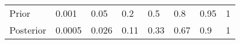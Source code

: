 \begin{table}[ht]
\centering
\begin{tabular}{llllllll}
  \hline
  \hline
Prior & 0.001 & 0.05 & 0.2 & 0.5 & 0.8 & 0.95 &   1 \\ 
  Posterior & 0.0005 & 0.026 & 0.11 & 0.33 & 0.67 & 0.9 &   1 \\ 
   \hline
\end{tabular}
\end{table}
